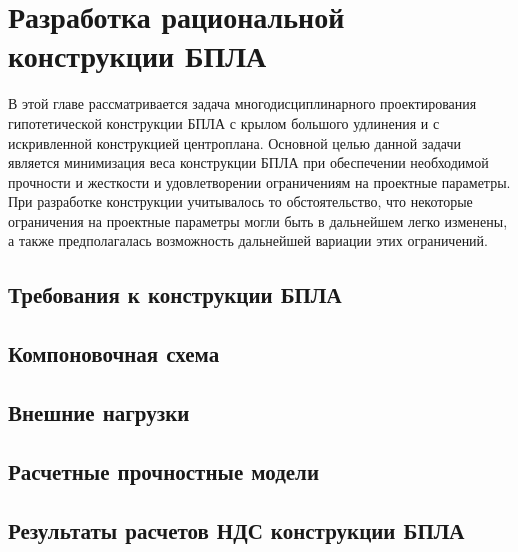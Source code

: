 \chapter{Разработка рациональной конструкции БПЛА}

В этой главе рассматривается задача многодисциплинарного проектирования гипотетической конструкции БПЛА с крылом большого удлинения и с искривленной конструкцией центроплана.  Основной целью данной задачи является минимизация веса конструкции БПЛА при обеспечении необходимой прочности и жесткости и удовлетворении ограничениям на проектные параметры. При разработке конструкции учитывалось то обстоятельство, что некоторые ограничения на проектные параметры могли быть в дальнейшем легко изменены, а также предполагалась возможность дальнейшей вариации этих ограничений.


\section{Требования к конструкции БПЛА}



\section{Компоновочная схема}
	

\section{Внешние нагрузки}
\label{sec:externalLoads}



\section{Расчетные прочностные модели}




\section{Результаты расчетов НДС конструкции БПЛА} 


%